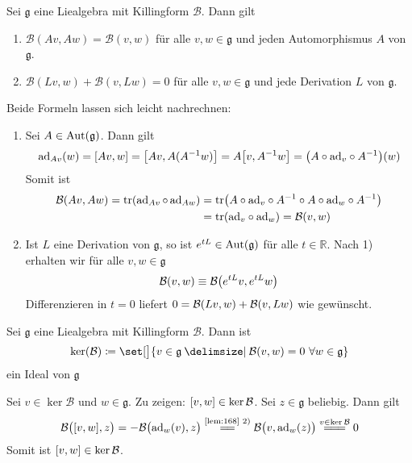 \begin{lemma}[label=lem:168,{name=[Verhalten Killingform mit Automorphismen]}]
	Sei $\mathfrak{g}$ eine Liealgebra mit Killingform $\mathcal{B}$.
	Dann gilt
	\begin{enumerate}[1)]
		\item $\mathcal{B}(Av,Aw) = \mathcal{B}(v,w)$ für alle $v,w \in \mathfrak{g}$ und jeden Automorphismus $A$ von $\mathfrak{g}$.
		\item $\mathcal{B}(Lv,w) + \mathcal{B}(v,Lw) =0$ für alle $v,w \in \mathfrak{g}$ und jede Derivation $L$ von $\mathfrak{g}$.
	\end{enumerate}
\end{lemma}
\begin{beweis}
	Beide Formeln lassen sich leicht nachrechnen:
	\begin{enumerate}[1)]
		\item Sei $A \in \Aut(\mathfrak{g})$.
		Dann gilt 
		\[
			\ad_{Av}(w) = \benbrace*{Av,w} = \benbrace*{Av,A (A^{-1}w)} = A \benbrace*{v,A^{-1} w} = \enbrace*{A \circ {\ad_v} \circ A^{-1}}(w)
		\]
		Somit ist
		\begin{align}
			\mathcal{B}(Av,Aw) =\tr \enbrace*{\ad_{Av} \circ \ad_{Aw}} &= \tr \enbrace*{A \circ {\ad_v} \circ A^{-1} \circ A \circ {\ad_w} \circ A^{-1}} \\
			&= \tr \enbrace*{{\ad_v} \circ {\ad_w}} = \mathcal{B}(v,w)
		\end{align}
		\item Ist $L$ eine Derivation von $\mathfrak{g}$, so ist $e^{tL} \in \Aut(\mathfrak{g})$ für alle $t \in \mathbb{R}$.
		Nach 1) erhalten wir für alle $v,w \in \mathfrak{g}$
		\[
			\mathcal{B}(v,w) \equiv \mathcal{B}\enbrace*{e^{tL}v, e^{tL}w} 
		\]
		Differenzieren in $t=0$ liefert $0= \mathcal{B} \enbrace*{Lv,w} + \mathcal{B}(v,Lw)$ wie gewünscht.\qedhere
	\end{enumerate}
\end{beweis}

\begin{lemma}[label=lem:169,{name=[Kern der Killingform ist Ideal]}]
	Sei $\mathfrak{g}$ eine Liealgebra mit Killingform $\mathcal{B}$.
	Dann ist 
	\[
		\ker(\mathcal{B}) \coloneqq \set[\big]{v \in \mathfrak{g} \given \mathcal{B}(v,w)=0 \,\,\forall w \in \mathfrak{g}}
	\]
	ein Ideal von $\mathfrak{g}$
\end{lemma}
\begin{beweis}
	Sei $v \in \ker \mathcal{B}$ und $w \in \mathfrak{g}$.
	Zu zeigen: $\benbrace*{v,w} \in \ker \mathcal{B}$.
	Sei $z \in \mathfrak{g}$ beliebig.
	Dann gilt 
	\[
		\mathcal{B} \enbrace[\big]{\benbrace*{v,w},z} = - \mathcal{B} \enbrace[\big]{\ad_w(v),z} \StackText{\ref{lem:168} 2)}{=\joinrel=} \mathcal{B} \enbrace[\big]{v, \ad_w(z)} \stackrel{v \in \ker \mathcal{B}}{=\joinrel=\joinrel=}0 
	\]
	Somit ist $\benbrace*{v,w} \in \ker \mathcal{B}$.
\end{beweis}


